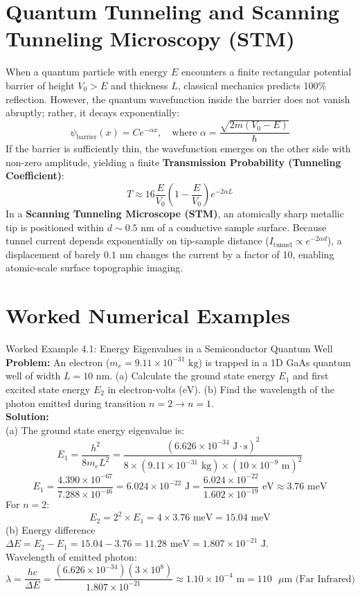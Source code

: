 \section{Quantum Tunneling and Scanning Tunneling Microscopy (STM)}
When a quantum particle with energy $E$ encounters a finite rectangular potential barrier of height $V_0 > E$ and thickness $L$, classical mechanics predicts 100\% reflection. However, the quantum wavefunction inside the barrier does not vanish abruptly; rather, it decays exponentially:
\begin{equation}
\psi_{\text{barrier}}(x) = C e^{-\alpha x}, \quad \text{where } \alpha = \frac{\sqrt{2m(V_0 - E)}}{\hbar}
\end{equation}
If the barrier is sufficiently thin, the wavefunction emerges on the other side with non-zero amplitude, yielding a finite \textbf{Transmission Probability (Tunneling Coefficient)}:
\begin{equation}
T \approx 16\frac{E}{V_0}\left(1 - \frac{E}{V_0}\right) e^{-2\alpha L}
\end{equation}
In a \textbf{Scanning Tunneling Microscope (STM)}, an atomically sharp metallic tip is positioned within $d \sim 0.5\text{ nm}$ of a conductive sample surface. Because tunnel current depends exponentially on tip-sample distance ($I_{\text{tunnel}} \propto e^{-2\alpha d}$), a displacement of barely $0.1\text{ nm}$ changes the current by a factor of 10, enabling atomic-scale surface topographic imaging.

\section{Worked Numerical Examples}

\begin{examplebox}{Worked Example 4.1: Energy Eigenvalues in a Semiconductor Quantum Well}
\textbf{Problem:} An electron ($m_e = 9.11 \times 10^{-31}\text{ kg}$) is trapped in a 1D GaAs quantum well of width $L = 10\text{ nm}$. (a) Calculate the ground state energy $E_1$ and first excited state energy $E_2$ in electron-volts ($\text{eV}$). (b) Find the wavelength of the photon emitted during transition $n = 2 \to n = 1$.\\
\textbf{Solution:}\\
(a) The ground state energy eigenvalue is:
\[
E_1 = \frac{h^2}{8m_e L^2} = \frac{(6.626 \times 10^{-34}\text{ J}\cdot\text{s})^2}{8 \times (9.11 \times 10^{-31}\text{ kg}) \times (10 \times 10^{-9}\text{ m})^2}
\]
\[
E_1 = \frac{4.390 \times 10^{-67}}{7.288 \times 10^{-46}} = 6.024 \times 10^{-22}\text{ J} = \frac{6.024 \times 10^{-22}}{1.602 \times 10^{-19}}\text{ eV} \approx 3.76\text{ meV}
\]
For $n = 2$:
\[
E_2 = 2^2 \times E_1 = 4 \times 3.76\text{ meV} = 15.04\text{ meV}
\]
(b) Energy difference $\Delta E = E_2 - E_1 = 15.04 - 3.76 = 11.28\text{ meV} = 1.807 \times 10^{-21}\text{ J}$.\\
Wavelength of emitted photon:
\[
\lambda = \frac{hc}{\Delta E} = \frac{(6.626 \times 10^{-34})(3 \times 10^8)}{1.807 \times 10^{-21}} \approx 1.10 \times 10^{-4}\text{ m} = 110\text{ }\mu\text{m}\text{ (Far Infrared)}
\]
\end{examplebox}

